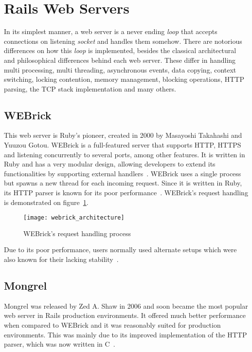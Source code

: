 \section{Rails Web Servers} %
\label{tech:sec:rails_webservers}
In its simplest manner, a web server is a never ending \textit{loop} that accepts connections on listening \textit{socket} and handles them somehow. There are notorious differences on how this \textit{loop} is implemented, besides the classical architectural and philosophical differences behind each web server. These differ in handling multi processing, multi threading, asynchronous events, data copying, context switching, locking contention, memory management, blocking operations, HTTP parsing, the TCP stack implementation and many others.


\subsection{WEBrick}
This web server is Ruby's pioneer, created in 2000 by Masayoshi Takahashi and Yuuzou Gotou. WEBrick is a full-featured server that supports HTTP, HTTPS and listening concurrently to several ports, among other features. It is written in Ruby and has a very modular design, allowing developers to extend its functionalities by supporting external handlers~\cite{webrick_guide}.
WEBrick uses a single process but spawns a new thread for each incoming request. Since it is written in Ruby, its HTTP parser is known for its poor performance~\cite{ruby_webservers}. WEBrick's request handling is demonstrated on figure~\ref{fig:webrick_architecture}.
\begin{figure}[h]
  \centering
    \texttt{[image: webrick\_architecture]}
  \caption{WEBrick's request handling process}
  \label{fig:webrick_architecture}
\end{figure}
Due to its poor performance, users normally used alternate setups which were also known for their lacking stability~\cite{ruby_webservers}.


\subsection{Mongrel}
Mongrel was released by Zed A. Shaw in 2006 and soon became the most popular web server in Rails production environments. It offered much better performance when compared to WEBrick and it was reasonably suited for production environments. This was mainly due to its improved implementation of the HTTP parser, which was now written in C~\cite{mongrel_server_production}.

